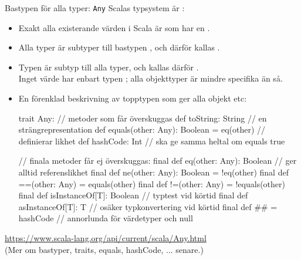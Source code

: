 


\begin{Slide}{Bastypen för alla typer: \texttt{Any}}
\SlideFontTiny
Scalas typsystem är :
\begin{itemize}\SlideFontTiny
  \item Exakt alla existerande värden i Scala är  som har en .
  \item Alla typer är subtyper till bastypen , och därför kallas .
  \item Typen  är subtyp till alla typer, och kallas därför . \\ Inget värde har enbart typen ; alla objekttyper är mindre specifika än så.
  \pause
  \item En förenklad beskrivning av topptypen  som ger alla objekt  etc:
\begin{CodeSmall}
trait Any:
  // metoder som får överskuggas
  def toString: String                        // en strängrepresentation
  def equals(other: Any): Boolean = eq(other) // definierar likhet
  def hashCode: Int                           // ska ge samma heltal om equals true

  // finala metoder får ej överskuggas:
  final def eq(other: Any): Boolean       // ger alltid referenslikhet
  final def ne(other: Any): Boolean = !eq(other)
  final def ==(other: Any) = equals(other)
  final def !=(other: Any) = !equals(other)
  final def isInstanceOf[T]: Boolean      // typtest vid körtid
  final def asInstanceOf[T]: T            // osäker typkonvertering vid körtid
  final def ## = hashCode                 // annorlunda för värdetyper och null
\end{CodeSmall}
\end{itemize}
\url{https://www.scala-lang.org/api/current/scala/Any.html}\\
(Mer om bastyper, traits, equals, hashCode, ... senare.)
\end{Slide}

